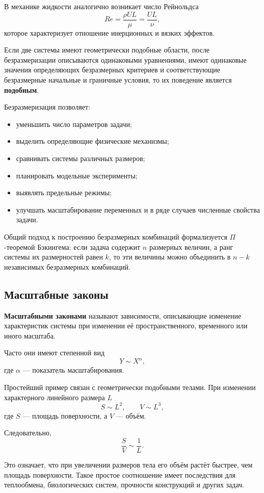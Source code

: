 В механике жидкости аналогично возникает число Рейнольдса
\[
Re=\frac{\rho UL}{\mu}
=\frac{UL}{\nu},
\]
которое характеризует отношение инерционных и вязких эффектов.

Если две системы имеют геометрически подобные области, после безразмеризации описываются одинаковыми уравнениями, имеют одинаковые значения определяющих безразмерных критериев и соответствующие безразмерные начальные и граничные условия, то их поведение является \textbf{подобным}.

Безразмеризация позволяет:
\begin{itemize}
	\item уменьшить число параметров задачи;
	\item выделить определяющие физические механизмы;
	\item сравнивать системы различных размеров;
	\item планировать модельные эксперименты;
	\item выявлять предельные режимы;
	\item улучшать масштабирование переменных и в ряде случаев численные свойства задачи.
\end{itemize}

Общий подход к построению безразмерных комбинаций формализуется $\Pi$-теоремой Бэкингема: если задача содержит $n$ размерных величин, а ранг системы их размерностей равен $k$, то эти величины можно объединить в $n-k$ независимых безразмерных комбинаций.

\subsection{Масштабные законы}

\textbf{Масштабными законами} называют зависимости, описывающие изменение характеристик системы при изменении её пространственного, временного или иного масштаба.

Часто они имеют степенной вид
\[
Y \sim X^\alpha,
\]
где $\alpha$ --- показатель масштабирования.

Простейший пример связан с геометрически подобными телами. При изменении характерного линейного размера $L$
\[
S\sim L^2,
\qquad
V\sim L^3,
\]
где $S$ --- площадь поверхности, а $V$ --- объём.

Следовательно,
\[
\frac{S}{V}\sim \frac{1}{L}.
\]

Это означает, что при увеличении размеров тела его объём растёт быстрее, чем площадь поверхности. Такое простое соотношение имеет последствия для теплообмена, биологических систем, прочности конструкций и других задач.

